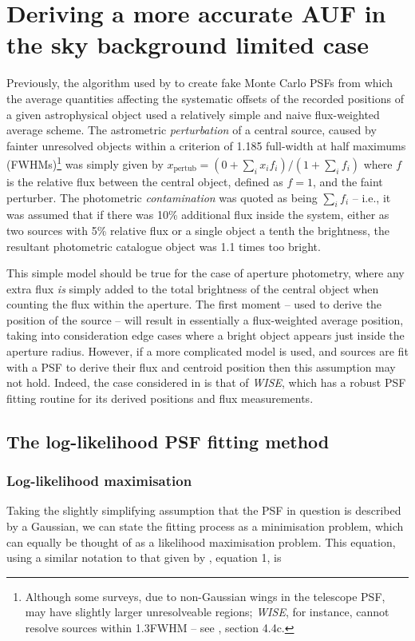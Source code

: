 \documentclass[fleqn,usenatbib]{mnras}
\begin{document}
\section{Deriving a more accurate AUF in the sky background limited case}
\label{sec:loglfit}
Previously, the algorithm used by \cite{2018MNRAS.481.2148W} to create fake Monte Carlo PSFs from which the average quantities affecting the systematic offsets of the recorded positions of a given astrophysical object used a relatively simple and naive flux-weighted average scheme. The astrometric \textit{perturbation} of a central source, caused by fainter unresolved objects within a \citet{1880MNRAS..40..254R} criterion of 1.185 full-width at half maximums (FWHMs)\footnote{Although some surveys, due to non-Gaussian wings in the telescope PSF, may have slightly larger unresolveable regions; \textit{WISE}, for instance, cannot resolve sources within 1.3FWHM -- see \citet{Cutri:2012aa}, section 4.4c.} was simply given by $x_\mathrm{pertub} = (0 + \sum_i x_i f_i) / (1 + \sum_i f_i)$ where $f$ is the relative flux between the central object, defined as $f=1$, and the faint perturber. The photometric \textit{contamination} was quoted as being $\sum_i f_i$ -- i.e., it was assumed that if there was 10\% additional flux inside the system, either as two sources with 5\% relative flux or a single object a tenth the brightness, the resultant photometric catalogue object was 1.1 times too bright.

This simple model should be true for the case of aperture photometry, where any extra flux \textit{is} simply added to the total brightness of the central object when counting the flux within the aperture. The first moment -- used to derive the position of the source -- will result in essentially a flux-weighted average position, taking into consideration edge cases where a bright object appears just inside the aperture radius. However, if a more complicated model is used, and sources are fit with a PSF to derive their flux and centroid position then this assumption may not hold. Indeed, the case considered in \citet{2018MNRAS.481.2148W} is that of \textit{WISE}, which has a robust PSF fitting routine for its derived positions and flux measurements.

\subsection{The log-likelihood PSF fitting method}
\subsubsection{Log-likelihood maximisation}
\label{sec:loglmax}
Taking the slightly simplifying assumption that the PSF in question is described by a Gaussian, we can state the fitting process as a minimisation problem, which can equally be thought of as a likelihood maximisation problem. This equation, using a similar notation to that given by \citet{2018MNRAS.476.4372}, equation 1, is
\end{document}
